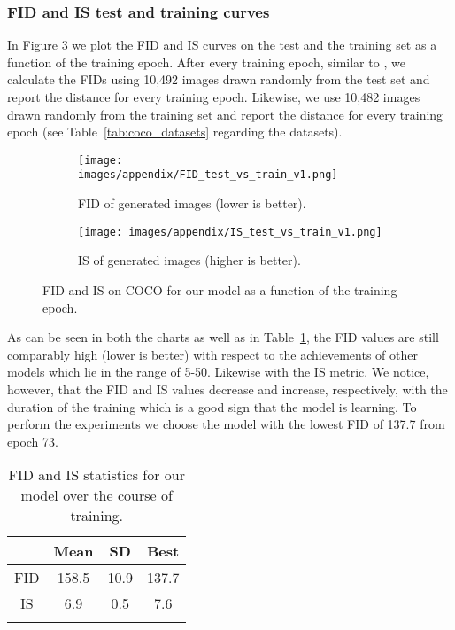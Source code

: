 \documentclass[12pt,a4paper]{article}
\begin{document}
\subsubsection{FID and IS test and training curves}\label{sec:train_vs_test_FID}
In Figure \ref{fig:fid_is_metrics} we plot the FID and IS curves on the test and the training set as a function of the training epoch. After every training epoch, similar to \cite{StyleGAN}, we calculate the FIDs using 10,492 images drawn randomly from the test set and report the distance for every training epoch. Likewise, we use 10,482 images drawn randomly from the training set and report the distance for every training epoch (see Table~\ref{tab:coco_datasets} regarding the datasets). 
\begin{figure}[h]
\begin{subfigure}{0.495\textwidth}
\texttt{[image: images/appendix/FID\_test\_vs\_train\_v1.png]}
\caption{FID of generated images (lower is better).}
\label{fig:fid_test_train}
\end{subfigure}
\begin{subfigure}{0.495\textwidth}
\texttt{[image: images/appendix/IS\_test\_vs\_train\_v1.png]}
\caption{IS of generated images (higher is better).}
\label{fig:is_test_train}
\end{subfigure}
\caption{FID and IS on COCO for our model as a function of the training epoch.}
\label{fig:fid_is_metrics}
\end{figure}
As can be seen in both the charts as well as in Table~\ref{tab:fid_is_stats}, the FID values are still comparably high (lower is better) with respect to the achievements of other models which lie in the range of 5-50. Likewise with the IS metric. We notice, however, that the FID and IS values decrease and increase, respectively, with the duration of the training which is a good sign that the model is learning. To perform the experiments we choose the model with the lowest FID of 137.7 from epoch 73.
\begin{table}[ht!]
\centering
\begin{tabular}{c|c|c|c}
\Xhline{0.8pt}
 & \textbf{Mean} & \textbf{SD} & \textbf{Best} \\
\hline
FID & 158.5 & 10.9 & 137.7\\
\hline
IS & 6.9 & 0.5 & 7.6\\
\Xhline{0.8pt}
\end{tabular}
\caption{FID and IS statistics for our model over the course of training.} 
\label{tab:fid_is_stats}
\end{table}
\end{document}
